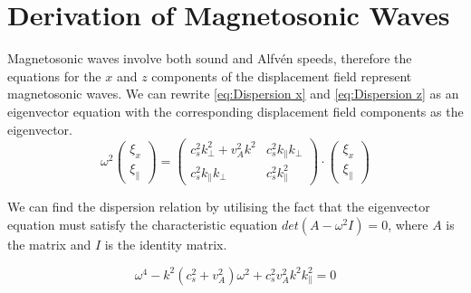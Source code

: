 \section{Derivation of Magnetosonic Waves}
Magnetosonic waves involve both sound and Alfv\'en speeds, therefore the equations for the \(x\) and \(z\) components of the displacement field represent magnetosonic waves. We can rewrite \eqref{eq:Dispersion x} and \eqref{eq:Dispersion z} as an eigenvector equation with the corresponding displacement field components as the eigenvector.
\begin{equation*}
    \omega^{2}
    \begin{pmatrix}
        \xi_{x} \\
        \xi_{\parallel}
    \end{pmatrix}
    =
    \begin{pmatrix}
        c_{s}^{2} k_{\perp}^{2} + v_{A}^{2} k^{2} & c_{s}^{2} k_{\parallel} k_{\perp} \\
        c_{s}^{2} k_{\parallel} k_{\perp} & c_{s}^{2} k_{\parallel}^{2}
    \end{pmatrix}
    \cdot
    \begin{pmatrix}
        \xi_{x} \\
        \xi_{\parallel}
    \end{pmatrix}
\end{equation*}

We can find the dispersion relation by utilising the fact that the eigenvector equation must satisfy the characteristic equation \(det(A-\omega^2I)=0\), where \(A\) is the matrix and \(I\) is the identity matrix. 

\begin{equation*}
    \omega^{4} - k^{2}\left(c_{s}^{2} + v_{A}^{2}\right)\omega^{2} + c_{s}^{2}v_{A}^{2}k^{2}k_{\parallel}^{2} = 0
\end{equation*}

